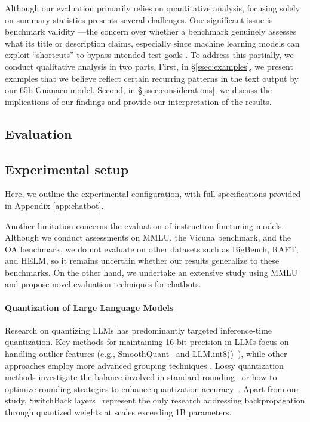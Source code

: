 Although our evaluation primarily relies on quantitative analysis, focusing solely on summary statistics presents several challenges. One significant issue is benchmark validity \citep{liao2021we}—the concern over whether a benchmark genuinely assesses what its title or description claims, especially since machine learning models can exploit ``shortcuts'' to bypass intended test goals \citep{gururangan2018annotation, poliak2018hypothesis}. To address this partially, we conduct qualitative analysis in two parts. First, in \S\ref{ssec:examples}, we present examples that we believe reflect certain recurring patterns in the text output by our 65b {Guanaco} model. Second, in \S\ref{ssec:considerations}, we discuss the implications of our findings and provide our interpretation of the results.

\subsection{Evaluation}

\subsection{Experimental setup} Here, we outline the experimental configuration, with full specifications provided in Appendix \ref{app:chatbot}.

Another limitation concerns the evaluation of instruction finetuning models. Although we conduct assessments on MMLU, the Vicuna benchmark, and the OA benchmark, we do not evaluate on other datasets such as BigBench, RAFT, and HELM, so it remains uncertain whether our results generalize to these benchmarks. On the other hand, we undertake an extensive study using MMLU and propose novel evaluation techniques for chatbots.

\paragraph{Quantization of Large Language Models} Research on quantizing LLMs has predominantly targeted inference-time quantization. Key methods for maintaining 16-bit precision in LLMs focus on handling outlier features (e.g., SmoothQuant~\citep{xiao2022smoothquant} and LLM.int8()~\citep{dettmers2022llm}), while other approaches employ more advanced grouping techniques \citep{park2022nuqmm, yao2022zeroquant}. Lossy quantization methods investigate the balance involved in standard rounding~\citep{dettmers2022case,zeng2022glm,pope2022efficiently} or how to optimize rounding strategies to enhance quantization accuracy~\citep{frantar2022gptq}. Apart from our study, SwitchBack layers~\citep{wortsman2023stable} represent the only research addressing backpropagation through quantized weights at scales exceeding 1B parameters.

